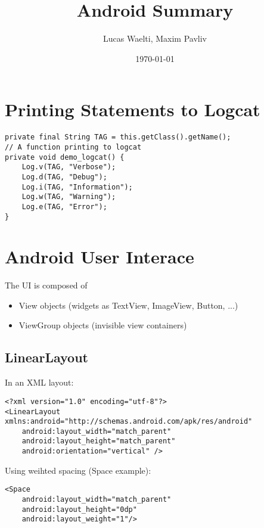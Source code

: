 \documentclass[11pt]{article}
\title{Android Summary}
\author{Lucas Waelti, Maxim Pavliv}
\date{\today}
\begin{document}
\maketitle
\tableofcontents
\newpage



\section{Printing Statements to Logcat}
\lstset{language = Java}
\begin{lstlisting}
private final String TAG = this.getClass().getName();
// A function printing to logcat
private void demo_logcat() {
    Log.v(TAG, "Verbose");
    Log.d(TAG, "Debug");
    Log.i(TAG, "Information");
    Log.w(TAG, "Warning");
    Log.e(TAG, "Error");
}
\end{lstlisting}

\section{Android User Interace}
The UI is composed of 
\begin{itemize}
    \item View objects (widgets as TextView, ImageView, Button, ...)
    \item ViewGroup objects (invisible view containers)
\end{itemize}

\subsection{LinearLayout}
In an XML layout:
\lstset{language = XML}
\begin{lstlisting}
<?xml version="1.0" encoding="utf-8"?>
<LinearLayout xmlns:android="http://schemas.android.com/apk/res/android"
    android:layout_width="match_parent"
    android:layout_height="match_parent"
    android:orientation="vertical" />
\end{lstlisting}
Using weihted spacing (Space example):
\begin{lstlisting}
<Space
    android:layout_width="match_parent"
    android:layout_height="0dp"
    android:layout_weight="1"/>
\end{lstlisting}
\end{document}
